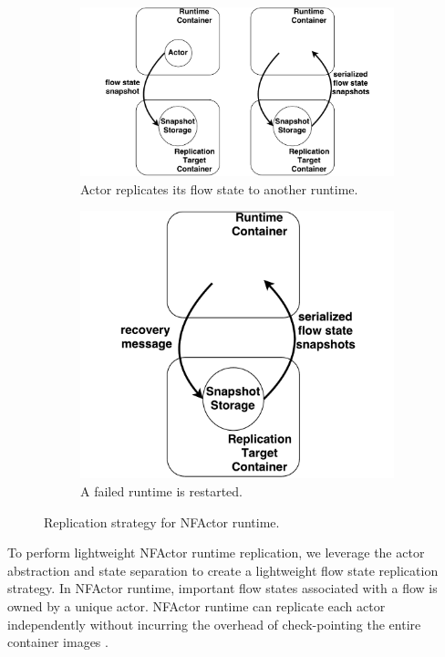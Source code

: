 \begin{figure}
	\begin{subfigure}[b]{0.45\columnwidth}
		\centering
		\includegraphics[width=\columnwidth]{figure/NFActor-Runtime-Replicate.pdf}
		\caption{Actor replicates its flow state to another
		runtime.}\label{fig:replicate} \end{subfigure}\hfill
	\begin{subfigure}[b]{0.45\columnwidth}
		\centering
		\includegraphics[width=\columnwidth]{figure/NFActor-Runtime-Recover.pdf}
		\caption{A failed runtime is restarted.}\label{fig:recover}
	\end{subfigure}%
\caption{Replication strategy for NFActor runtime.}
\end{figure}

To perform lightweight NFActor runtime replication, we leverage the actor 
abstraction and state separation to create a lightweight flow state replication 
strategy. In NFActor runtime, important flow states associated with a flow is 
owned by a unique actor. NFActor runtime can replicate each actor 
independently without incurring the overhead of check-pointing the entire 
container images \cite{sherry2015rollback, rajagopalan2013pico}.

